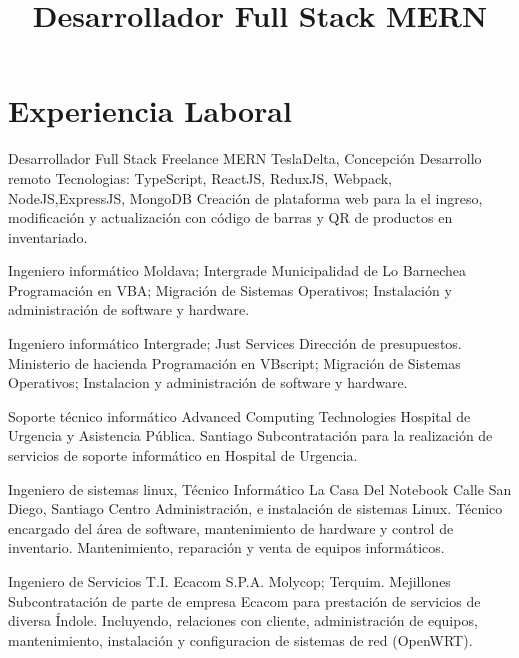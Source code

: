 \documentclass[draft,color,12pt,letterpaper,sans]{moderncv}
\title{Desarrollador Full Stack MERN}
\begin{document}
\makecvtitle %

\section{Experiencia Laboral}
{Desarrollador Full Stack Freelance MERN}
{TeslaDelta, Concepci\'on}
{Desarrollo remoto\newline}
{Tecnologias: TypeScript, ReactJS, ReduxJS, Webpack, NodeJS,ExpressJS, MongoDB}
{Creaci\'on de plataforma web para la el ingreso, modificaci\'on y actualizaci\'on con c\'odigo de barras y QR de productos en inventariado.\newline}

{Ingeniero inform\'atico}
{Moldava; Intergrade}
{Municipalidad de Lo Barnechea}
{}
{Programaci\'on en VBA; Migraci\'on de Sistemas Operativos; Instalaci\'on y administraci\'on de software y hardware.\newline}


{Ingeniero inform\'atico}
{Intergrade; Just Services}
{Direcci\'on de presupuestos. Ministerio de hacienda}
{}
{Programaci\'on en VBscript; Migraci\'on de Sistemas Operativos; Instalacion y administraci\'on de software y hardware.\newline}

{Soporte t\'ecnico inform\'atico}
{Advanced Computing Technologies}
{Hospital de Urgencia y Asistencia P\'ublica. Santiago}
{}
{Subcontrataci\'on para la realizaci\'on de servicios de soporte inform\'atico en Hospital de Urgencia.\newline}

{Ingeniero de sistemas linux, T\'ecnico Inform\'atico}
{La Casa Del Notebook}
{Calle San Diego, Santiago Centro}
{}
{Administraci\'on, e instalaci\'on de sistemas Linux. T\'ecnico encargado del \'area de software, mantenimiento de hardware y control de inventario. Mantenimiento, reparaci\'on y venta de equipos inform\'aticos.\newline} 

{Ingeniero de Servicios T.I.}
{Ecacom S.P.A.}
{Molycop; Terquim. Mejillones}
{}
{Subcontrataci\'on de parte de empresa Ecacom para prestaci\'on de servicios de diversa \'Indole. Incluyendo, relaciones con cliente, administraci\'on de equipos, mantenimiento, instalaci\'on y configuracion de sistemas de red (OpenWRT).\newline}
\end{document}
